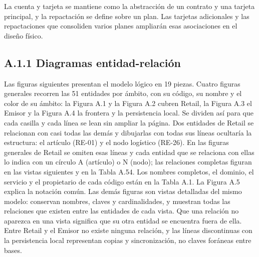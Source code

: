 \documentclass[11pt]{article}
\begin{document}
La cuenta y tarjeta se mantiene como la abstracción de un contrato y una tarjeta principal, y la repactación se define sobre un plan. Las tarjetas adicionales y las repactaciones que consoliden varios planes ampliarán esas asociaciones en el diseño físico.

\subsection{A.1.1 Diagramas entidad-relación}

Las figuras siguientes presentan el modelo lógico en 19 piezas. Cuatro figuras generales recorren las 51 entidades por ámbito, con su código, su nombre y el color de su ámbito: la Figura A.1 y la Figura A.2 cubren Retail, la Figura A.3 el Emisor y la Figura A.4 la frontera y la persistencia local. Se dividen así para que cada casilla y cada línea se lean sin ampliar la página. Dos entidades de Retail se relacionan con casi todas las demás y dibujarlas con todas sus líneas ocultaría la estructura: el artículo (RE-01) y el nodo logístico (RE-26). En las figuras generales de Retail se omiten esas líneas y cada entidad que se relaciona con ellas lo indica con un círculo A (artículo) o N (nodo); las relaciones completas figuran en las vistas siguientes y en la Tabla A.54. Los nombres completos, el dominio, el servicio y el propietario de cada código están en la Tabla A.1. La Figura A.5 explica la notación común. Las demás figuras son vistas detalladas del mismo modelo: conservan nombres, claves y cardinalidades, y muestran todas las relaciones que existen entre las entidades de cada vista. Que una relación no aparezca en una vista significa que su otra entidad se encuentra fuera de ella. Entre Retail y el Emisor no existe ninguna relación, y las líneas discontinuas con la persistencia local representan copias y sincronización, no claves foráneas entre bases.
\end{document}
